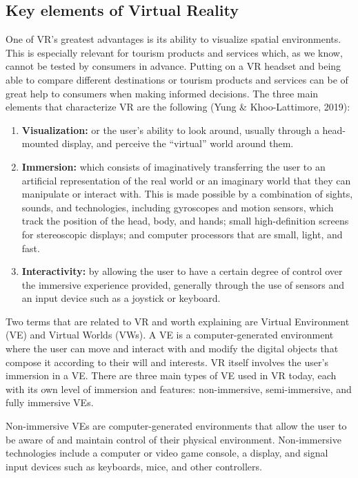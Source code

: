 \documentclass[
  letterpaper,
  DIV=11,
  numbers=noendperiod]{scrreprt}
\begin{document}
\hypertarget{key-elements-of-virtual-reality}{%
\subsection{Key elements of Virtual
Reality}\label{key-elements-of-virtual-reality}}

One of VR's greatest advantages is its ability to visualize spatial
environments. This is especially relevant for tourism products and
services which, as we know, cannot be tested by consumers in advance.
Putting on a VR headset and being able to compare different destinations
or tourism products and services can be of great help to consumers when
making informed decisions. The three main elements that characterize VR
are the following (Yung \& Khoo-Lattimore, 2019):

\begin{enumerate}
\def\labelenumi{\arabic{enumi}.}
\item
  \textbf{Visualization:} or the user's ability to look around, usually
  through a head-mounted display, and perceive the ``virtual'' world
  around them.
\item
  \textbf{Immersion:} which consists of imaginatively transferring the
  user to an artificial representation of the real world or an imaginary
  world that they can manipulate or interact with. This is made possible
  by a combination of sights, sounds, and technologies, including
  gyroscopes and motion sensors, which track the position of the head,
  body, and hands; small high-definition screens for stereoscopic
  displays; and computer processors that are small, light, and fast.
\item
  \textbf{Interactivity:} by allowing the user to have a certain degree
  of control over the immersive experience provided, generally through
  the use of sensors and an input device such as a joystick or keyboard.
\end{enumerate}

Two terms that are related to VR and worth explaining are Virtual
Environment (VE) and Virtual Worlds (VWs). A VE is a computer-generated
environment where the user can move and interact with and modify the
digital objects that compose it according to their will and interests.
VR itself involves the user's immersion in a VE. There are three main
types of VE used in VR today, each with its own level of immersion and
features: non-immersive, semi-immersive, and fully immersive VEs.

Non-immersive VEs are computer-generated environments that allow the
user to be aware of and maintain control of their physical environment.
Non-immersive technologies include a computer or video game console, a
display, and signal input devices such as keyboards, mice, and other
controllers.
\end{document}
